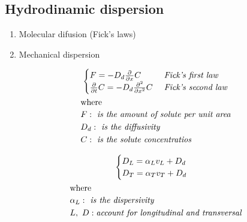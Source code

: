 \documentclass[landscape]{article}
\begin{document}
\begin{multicols*}{3}
\subsection{Hydrodinamic dispersion} %
\label{sub:hydrodinamic_dispersion}
  \begin{enumerate}
    \item Molecular difusion (Fick’s laws)
    \item Mechanical dispersion
  \end{enumerate}
    \begin{gather}\label{eq:2.1}
      \begin{cases}
        F = -D_d\frac{\partial }{\partial x}C & \emph{ Fick’s first law}\\
        \frac{\partial }{\partial t}C = -D_d\frac{\partial^2 }{\partial x^2}C & \emph{ Fick’s second law}
       \end{cases}\notag \\
      \shortintertext{where}
      \begin{aligned}
        & F: \emph{ is the amount of solute per unit area} \\
        & D_d: \emph{ is the diffusivity}\\
        & C: \emph{ is the solute concentratios}\\
      \end{aligned}\notag
      \end{gather}

    \begin{gather}\label{eq:2.1}
      \begin{cases}
         D_L = \alpha_Lv_L+ D_d\\
         D_T = \alpha_Tv_T+ D_d
       \end{cases} \notag\\
      \shortintertext{where}
      \begin{aligned}
        & \alpha_L: \emph{ is the dispersivity} \\
        & L, \ D: \emph{account for longitudinal and transversal}
      \end{aligned}\notag
      \end{gather}


\end{multicols*}
\end{document}
